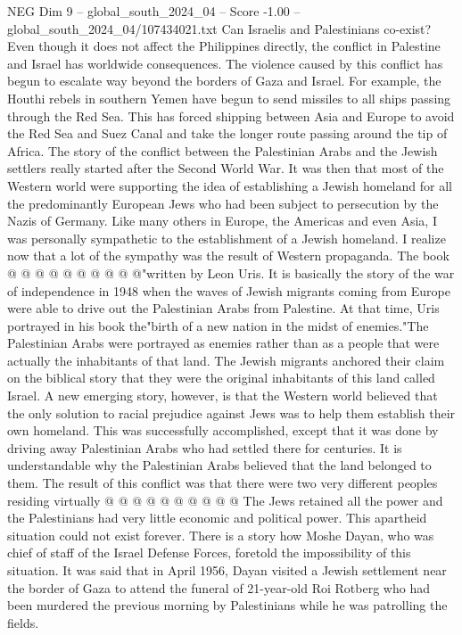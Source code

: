 \begin{textsample}{NEG Dim 9 – global\_south\_2024\_04 – Score -1.00 – global\_south\_2024\_04/107434021.txt}  \label{ex:f9_neg_384}
Can Israelis and Palestinians co-exist?
Even though it does not affect the Philippines directly, the conflict in Palestine and Israel has worldwide consequences.
The violence caused by this conflict has begun to escalate way beyond the borders of Gaza and Israel.
For example, the Houthi rebels in southern Yemen have begun to send missiles to all ships passing through the Red Sea.
This has forced shipping between Asia and Europe to avoid the Red Sea and Suez Canal and take the longer route passing around the tip of Africa.
The story of the conflict between the Palestinian Arabs and the Jewish settlers really started after the Second World War.
It was then that most of the Western world were supporting the idea of establishing a Jewish homeland for all the predominantly European Jews who had been subject to persecution by the Nazis of Germany.
Like many others in Europe, the Americas and even Asia, I was personally sympathetic to the establishment of a Jewish homeland.
I realize now that a lot of the sympathy was the result of Western propaganda.
The book @ @ @ @ @ @ @ @ @ @"written by Leon Uris.
It is basically the story of the war of independence in 1948 when the waves of Jewish migrants coming from Europe were able to drive out the Palestinian Arabs from Palestine.
At that time, Uris portrayed in his book the"birth of a new nation in the midst of enemies."The Palestinian Arabs were portrayed as enemies rather than as a people that were actually the inhabitants of that land.
The Jewish migrants anchored their claim on the biblical story that they were the original inhabitants of this land called Israel.
A new emerging story, however, is that the Western world believed that the only solution to racial prejudice against Jews was to help them establish their own homeland.
This was successfully accomplished, except that it was done by driving away Palestinian Arabs who had settled there for centuries.
It is understandable why the Palestinian Arabs believed that the land belonged to them.
The result of this conflict was that there were two very different peoples residing virtually @ @ @ @ @ @ @ @ @ @ The Jews retained all the power and the Palestinians had very little economic and political power.
This apartheid situation could not exist forever.
There is a story how Moshe Dayan, who was chief of staff of the Israel Defense Forces, foretold the impossibility of this situation.
It was said that in April 1956, Dayan visited a Jewish settlement near the border of Gaza to attend the funeral of 21-year-old Roi Rotberg who had been murdered the previous morning by Palestinians while he was patrolling the fields.

\end{textsample}
